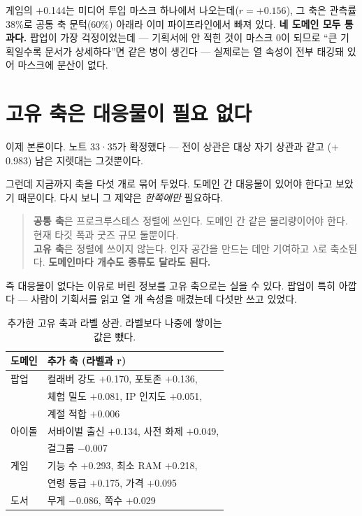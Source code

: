 \documentclass[10pt]{article}
\begin{document}
게임의 $+$0.144는 미디어 투입 마스크 하나에서 나오는데($r=+0.156$), 그 축은
관측률 38\%로 공통 축 문턱(60\%) 아래라 이미 파이프라인에서 빠져 있다.
\textbf{네 도메인 모두 통과다.} 팝업이 가장 걱정이었는데 --- 기획서에 안 적힌
것이 마스크 0이 되므로 ``큰 기획일수록 문서가 상세하다''면 같은 병이 생긴다 ---
실제로는 열 속성이 전부 태깅돼 있어 마스크에 분산이 없다.

\section{고유 축은 대응물이 필요 없다}

이제 본론이다. 노트 33·35가 확정했다 --- 전이 상관은 대상 자기 상관과 같고
($+$0.983) 남은 지렛대는 그것뿐이다.

그런데 지금까지 축을 다섯 개로 묶어 두었다. 도메인 간 대응물이 있어야 한다고
보았기 때문이다. 다시 보니 그 제약은 \emph{한쪽에만} 필요하다.

\begin{quote}\fontsize{9.5}{11.5}\selectfont
\textbf{공통 축}은 프로크루스테스 정렬에 쓰인다. 도메인 간 같은 물리량이어야
한다. 현재 타깃 폭과 굿즈 규모 둘뿐이다.\\[0.3em]
\textbf{고유 축}은 정렬에 쓰이지 않는다. 인자 공간을 만드는 데만 기여하고
$\lambda$로 축소된다. \textbf{도메인마다 개수도 종류도 달라도 된다.}
\end{quote}

즉 대응물이 없다는 이유로 버린 정보를 고유 축으로는 실을 수 있다. 팝업이 특히
아깝다 --- 사람이 기획서를 읽고 열 개 속성을 매겼는데 다섯만 쓰고 있었다.

\begin{table}[t]
\centering\tsize
\caption{추가한 고유 축과 라벨 상관. 라벨보다 나중에 쌓이는 값은 뺐다.}
\begin{tabular}{ll}
\toprule
도메인 & 추가 축 (라벨과 r) \\
\midrule
팝업 & 컬래버 강도 $+$0.170, 포토존 $+$0.136, \\
     & 체험 밀도 $+$0.081, IP 인지도 $+$0.051, \\
     & 계절 적합 $+$0.006 \\
아이돌 & 서바이벌 출신 $+$0.134, 사전 화제 $+$0.049, \\
     & 걸그룹 $-$0.007 \\
게임 & 기능 수 $+$0.293, 최소 RAM $+$0.218, \\
     & 연령 등급 $+$0.175, 가격 $+$0.095 \\
도서 & 무게 $-$0.086, 쪽수 $+$0.029 \\
\bottomrule
\end{tabular}
\end{table}
\end{document}
